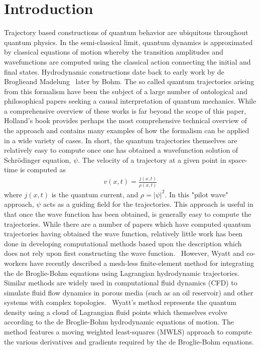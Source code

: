 \section{Introduction}
Trajectory based constructions of quantum behavior are ubiquitous 
throughout quantum physics.  In the semi-classical limit, quantum 
dynamics is approximated by classical equations of motion whereby the 
transition amplitudes and wavefunctions are computed using the 
classical action connecting the initial and final states.  
Hydrodynamic constructions date back to early work by de 
Broglie\cite{ref01,ref02,ref03,ref04,ref05}and Madelung~\cite{ref5a} 
later by Bohm.  \cite{ref06,ref07} The so called quantum trajectories 
arising from this formalism have been the subject of a large number of 
ontological and philosophical papers seeking a causal interpretation 
of quantum mechanics.  While a comprehensive overview of these works 
is far beyond the scope of this paper, Holland's book provides perhaps 
the most comprehensive technical overview of the approach and contains 
many examples of how the formalism can be applied in a wide variety of 
cases.\cite{ref08} In short, the quantum trajectories themselves are 
relatively easy to compute once one has obtained a wavefunction 
solution of Schr\"odinger equation, $\psi$.  The velocity of a 
trajectory at a given point in space-time is computed as
\begin{eqnarray}
    v(x,t)=\frac{j(x,t)}{\rho (x,t)}
 \label{eq:0}
\end{eqnarray}
where $j(x,t)$ is the quantum current, and $\rho=|\psi|^2$.  In this 
"pilot wave" approach, $\psi$ acts as a guiding field for the 
trajectories.  This approach is useful in that once the wave function 
has been obtained, is generally easy to compute the trajectories.  
While there are a number of papers which have computed quantum 
trajectories having obtained the wave function, relatively little work 
has been done in developing computational methods based upon the 
description which does not rely upon first constructing the wave 
function.~\cite{ref09,ref10,ref11,ref12,ref13,ref14} However, Wyatt 
and co-workers have recently described a mesh-less finite-element 
method for integrating the de Broglie-Bohm equations using Lagrangian 
hydrodynamic trajectories.\cite{ref15,ref16,ref17} Similar methods are 
widely used in computational fluid dynamics (CFD) to simulate fluid 
flow dynamics in porous media (such as an oil reservoir) and other 
systems with complex topologies.~\cite{ref18} Wyatt's method 
represents the quantum density using a cloud of Lagrangian fluid 
points which themselves evolve according to the de Broglie-Bohm 
hydrodynamic equations of motion.  The method features a moving 
weighted least-squares (MWLS) approach to compute the various 
derivatives and gradients required by the de Broglie-Bohm equations.


